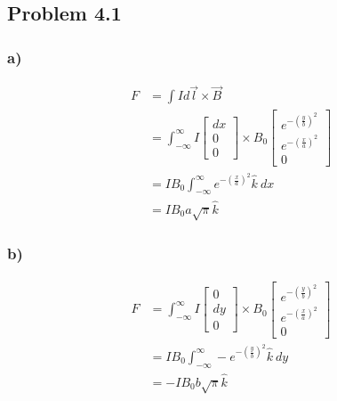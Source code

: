 \documentclass[../homework.tex]{subfiles}
\begin{document}
\subsection{Problem 4.1}
\subsubsection*{a)}
\begin{align*}
    F &= \int I d\vec{l} \times \vec{B} \\
      &= \int_{-\infty}^{\infty} I
      \begin{bmatrix}
          dx \\
          0 \\
          0
      \end{bmatrix} \times B_0
      \begin{bmatrix}
        e^{-\left(\frac{y}{b}\right)^2} \\
        e^{-\left(\frac{x}{a}\right)^2} \\
        0
    \end{bmatrix} \\
    &= I B_0 \int_{-\infty}^{\infty} e^{-\left(\frac{x}{a}\right)^2}\hat{k}~dx \\
    &= I B_0 a \sqrt{\pi} \hat{k}
\end{align*}

\subsubsection*{b)}
\begin{align*}
    F &= \int_{-\infty}^{\infty} I
      \begin{bmatrix}
          0 \\
          dy \\
          0
      \end{bmatrix} \times B_0
      \begin{bmatrix}
        e^{-\left(\frac{y}{b}\right)^2} \\
        e^{-\left(\frac{x}{a}\right)^2} \\
        0
    \end{bmatrix} \\
    &= I B_0 \int_{-\infty}^{\infty} -e^{-\left(\frac{y}{b}\right)^2}\hat{k}~dy \\
    &= -I B_0 b \sqrt{\pi} \hat{k}
\end{align*}
\end{document}

